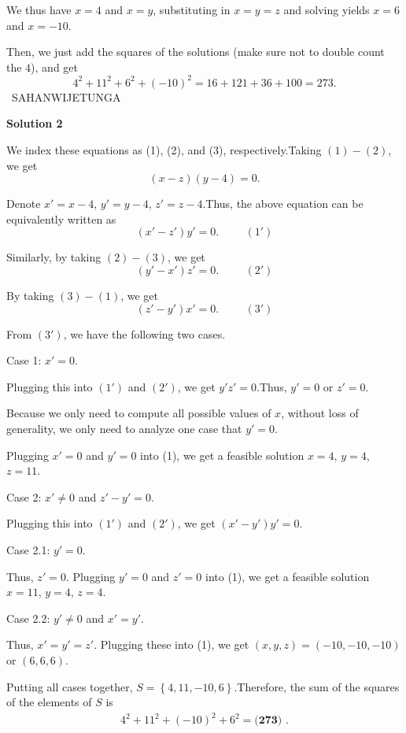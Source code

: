 \begin{enumerate}
 We thus have $x=4$ and $x=y$, substituting in $x=y=z$ and solving yields $x=6$ and $x=-10$.

 Then, we just add the squares of the solutions (make sure not to double count the $4$), and get 
 \[4^2+11^2+6^2+(-10)^2=16+121+36+100=\boxed{273}.\]~SAHANWIJETUNGA

 



\textbf{Solution 2}

We index these equations as (1), (2), and (3), respectively.Taking $(1)-(2)$, we get
 \[ \left( x - z \right) \left( y - 4 \right) = 0 . \]

 Denote $x' = x - 4$, $y' = y - 4$, $z' = z - 4$.Thus, the above equation can be equivalently written as
 \[ \left( x' - z' \right) y' = 0 . \hspace{1cm} (1') \]

 Similarly, by taking $(2)-(3)$, we get
 \[ \left( y' - x' \right) z' = 0 . \hspace{1cm} (2') \]

 By taking $(3) - (1)$, we get
 \[ \left( z' - y' \right) x' = 0 . \hspace{1cm} (3') \]

 From $(3')$, we have the following two cases.

 Case 1: $x' = 0$.

 Plugging this into $(1')$ and $(2')$, we get $y'z' = 0$.Thus, $y' = 0$ or $z' = 0$.

 Because we only need to compute all possible values of $x$, without loss of generality, we only need to analyze one case that $y' = 0$.

 Plugging $x' = 0$ and $y' = 0$ into (1), we get a feasible solution $x = 4$, $y = 4$, $z = 11$.

 Case 2: $x' \neq 0$ and $z' - y' = 0$.

 Plugging this into $(1')$ and $(2')$, we get $\left( x' - y' \right) y' = 0$.

 Case 2.1: $y' = 0$.

 Thus, $z' = 0$. Plugging $y' = 0$ and $z' = 0$ into (1), we get a feasible solution $x = 11$, $y = 4$, $z = 4$.

 Case 2.2: $y' \neq 0$ and $x' = y'$.

 Thus, $x' = y' = z'$. Plugging these into (1), we get $\left( x, y, z \right) = \left( -10, -10, -10 \right)$ or $\left( 6, 6, 6 \right)$.

 Putting all cases together, $S = \left\{ 4, 11, -10, 6 \right\}$.Therefore, the sum of the squares of the elements of $S$ is
 \begin{align*} 4^2 + 11^2 + \left( -10 \right)^2 + 6^2 = \boxed{\textbf{(273) }}  . \end{align*}






\end{enumerate}
